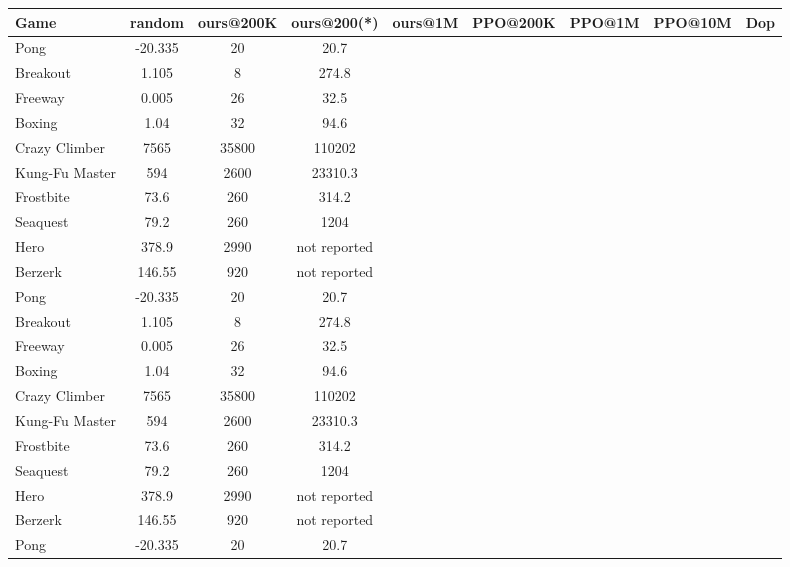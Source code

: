 \begin{table}[H]
\begin{center}
{\scriptsize{
\begin{tabular}{|l|c|c|c|c|c|c|c|c|}
\hline
Game          & random & ours@200K & ours@200(*) & ours@1M  & PPO@200K & PPO@1M & PPO@10M &  Dop \\
\hline
Pong           & -20.335 & 20         & 20.7    \\
Breakout       & 1.105   & 8          & 274.8     \\
Freeway        & 0.005   & 26         & 32.5    \\
Boxing         & 1.04    & 32         & 94.6     \\
Crazy Climber  & 7565    & 35800      & 110202 \\
Kung-Fu Master & 594     & 2600       & 23310.3  \\
Frostbite      & 73.6    & 260        & 314.2   \\
Seaquest       & 79.2    & 260        & 1204   \\
Hero           & 378.9   & 2990       & not reported  \\
Berzerk        & 146.55  & 920        & not reported   \\
Pong           & -20.335 & 20         & 20.7    \\
Breakout       & 1.105   & 8          & 274.8     \\
Freeway        & 0.005   & 26         & 32.5    \\
Boxing         & 1.04    & 32         & 94.6     \\
Crazy Climber  & 7565    & 35800      & 110202 \\
Kung-Fu Master & 594     & 2600       & 23310.3  \\
Frostbite      & 73.6    & 260        & 314.2   \\
Seaquest       & 79.2    & 260        & 1204   \\
Hero           & 378.9   & 2990       & not reported  \\
Berzerk        & 146.55  & 920        & not reported   \\
Pong           & -20.335 & 20         & 20.7    \\

\end{tabular}}}
\end{center}
\end{table}
